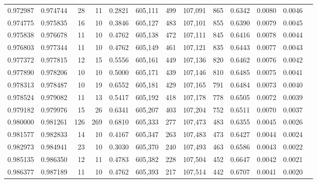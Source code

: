 \begin{tabular}{rrrrrrrrrrrrr}
0.972987 & 0.974744 &    28 &  11 &                                     0.2821 & 605,111 &     499 & 107,091 &     865 & 0.6342 & 0.0080 & 0.0046 \\
0.974775 & 0.975835 &    16 &  10 &                                     0.3846 & 605,127 &     483 & 107,101 &     855 & 0.6390 & 0.0079 & 0.0045 \\
0.975838 & 0.976678 &    11 &  10 &                                     0.4762 & 605,138 &     472 & 107,111 &     845 & 0.6416 & 0.0078 & 0.0044 \\
0.976803 & 0.977344 &    11 &  10 &                                     0.4762 & 605,149 &     461 & 107,121 &     835 & 0.6443 & 0.0077 & 0.0043 \\
0.977372 & 0.977815 &    12 &  15 &                                     0.5556 & 605,161 &     449 & 107,136 &     820 & 0.6462 & 0.0076 & 0.0042 \\
0.977890 & 0.978206 &    10 &  10 &                                     0.5000 & 605,171 &     439 & 107,146 &     810 & 0.6485 & 0.0075 & 0.0041 \\
0.978313 & 0.978487 &    10 &  19 &                                     0.6552 & 605,181 &     429 & 107,165 &     791 & 0.6484 & 0.0073 & 0.0040 \\
0.978524 & 0.979082 &    11 &  13 &                                     0.5417 & 605,192 &     418 & 107,178 &     778 & 0.6505 & 0.0072 & 0.0039 \\
0.979182 & 0.979976 &    15 &  26 &                                     0.6341 & 605,207 &     403 & 107,204 &     752 & 0.6511 & 0.0070 & 0.0037 \\
0.980000 & 0.981261 &   126 & 269 &                                     0.6810 & 605,333 &     277 & 107,473 &     483 & 0.6355 & 0.0045 & 0.0026 \\
0.981577 & 0.982833 &    14 &  10 &                                     0.4167 & 605,347 &     263 & 107,483 &     473 & 0.6427 & 0.0044 & 0.0024 \\
0.982973 & 0.984941 &    23 &  10 &                                     0.3030 & 605,370 &     240 & 107,493 &     463 & 0.6586 & 0.0043 & 0.0022 \\
0.985135 & 0.986350 &    12 &  11 &                                     0.4783 & 605,382 &     228 & 107,504 &     452 & 0.6647 & 0.0042 & 0.0021 \\
0.986377 & 0.987189 &    11 &  10 &                                     0.4762 & 605,393 &     217 & 107,514 &     442 & 0.6707 & 0.0041 & 0.0020 \\

\end{tabular}

